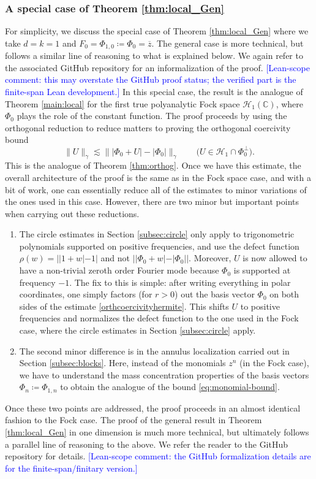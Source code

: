 \documentclass[11pt]{amsart}
\theoremstyle{remark}
\newcommand{\abs}[1]{\lvert #1 \rvert}
\newcommand{\norm}[1]{\lVert #1 \rVert}
\begin{document}
\subsubsection{A special case of Theorem \ref{thm:local_Gen}} For simplicity, we discuss the special case of Theorem \ref{thm:local_Gen} where we take $d=k=1$ and $F_0=\Phi_{1,0}\coloneq \Phi_0=\overline{z}$. The general case is more technical, but follows a similar line of reasoning to what is explained below. We again refer to the associated GitHub repository for an informalization of the proof.  \textcolor{blue}{[Lean-scope comment: this may overstate the GitHub proof status; the verified part is the finite-span Lean development.] } In this special case, the result is the analogue of Theorem \ref{main:local} for the first true polyanalytic Fock space $\mathcal{H}_1(\mathbb{C})$, where $\Phi_0$ plays the role of the constant function. The proof proceeds by using the orthogonal reduction to reduce matters to proving the orthogonal coercivity bound
\begin{equation}\label{orthcoercivityhermite}
\norm{U}_\gamma
\lesssim
\norm{\abs{\Phi_0 + U} - \abs{\Phi_0}}_\gamma
\qquad
\bigl(U \in \mathcal{H}_1 \cap \Phi_0^\perp\bigr).
\end{equation}
This is the analogue of Theorem \ref{thm:orthog}. Once we have this estimate, the overall architecture of the proof is the same as in the Fock space case, and with a bit of work, one can essentially reduce all of the estimates to minor variations of the ones used in this case. However, there are two minor but important points when carrying out these reductions.
\begin{enumerate}
\item The circle estimates in Section \ref{subsec:circle} only apply to trigonometric polynomials supported on positive frequencies, and use the defect function $\rho(w)=||1+w|-1|$ and not $||\Phi_0+w|-|\Phi_0||$. Moreover, $U$ is now allowed to have a non-trivial zeroth order Fourier mode because $\Phi_0$ is supported at frequency $-1$. The fix to this is simple: after writing everything in polar coordinates, one simply factors (for $r>0$) out the basis vector $\Phi_0$ on both sides of the estimate \eqref{orthcoercivityhermite}. This shifts $U$ to positive frequencies and normalizes the defect function to the one used in the Fock case, where the circle estimates in Section \ref{subsec:circle} apply.
\item The second minor difference is in the annulus localization carried out in Section \ref{subsec:blocks}. Here, instead of the monomials $z^n$ (in the Fock case), we have to understand the mass concentration properties of the basis vectors $\Phi_n\coloneq \Phi_{1,n}$ to obtain the analogue of the bound \eqref{eq:monomial-bound}.
\end{enumerate}
Once these two points are addressed, the proof proceeds in an almost identical fashion to the Fock case. The proof of the general result in Theorem \ref{thm:local_Gen} in one dimension is much more technical, but ultimately follows a parallel line of reasoning to the above. We refer the reader to the GitHub repository for details. \textcolor{blue}{[Lean-scope comment: the GitHub formalization details are for the finite-span/finitary version.] }
\end{document}

